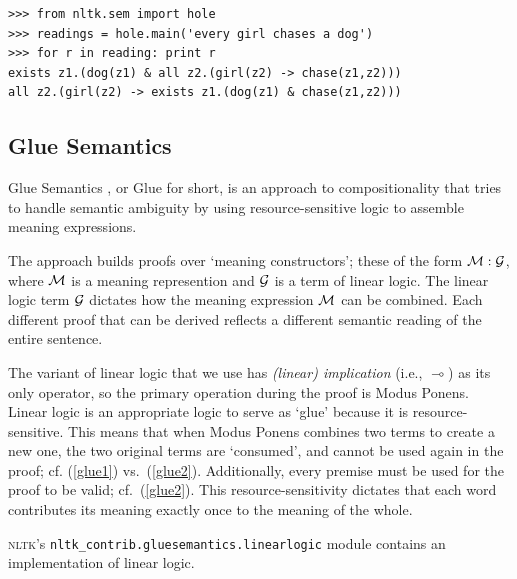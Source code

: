 \documentclass[11pt, a4paper]{article}
\newcommand{\NLTK}{\textsc{nltk}}
\newcommand{\dhgcode}[1]{{\tt #1}}
\begin{document}
\begin{Verbatim}
>>> from nltk.sem import hole
>>> readings = hole.main('every girl chases a dog')
>>> for r in reading: print r
exists z1.(dog(z1) & all z2.(girl(z2) -> chase(z1,z2)))
all z2.(girl(z2) -> exists z1.(dog(z1) & chase(z1,z2)))
\end{Verbatim}


\subsection{Glue Semantics}
Glue Semantics \citep{Dalrymple:1999:RRB,Dalrymple2001}, or Glue for
short, is an approach
to compositionality that tries to handle semantic ambiguity by using resource-sensitive logic to assemble meaning
expressions.  

The approach builds proofs over `meaning constructors'; these of the
form $\cal{M}: \cal{G}$, where $\cal{M}$ is a meaning represention and
$\cal{G}$ is a term of linear logic.  The linear logic term $\cal{G}$
dictates how the meaning expression $\cal{M}$ can be combined.  Each
different proof that can be derived reflects a different semantic
reading of the entire sentence.

The variant of linear logic that we use has \emph{(linear)
  implication} (i.e., $\multimap$)  as its
only operator, so the primary operation during the proof is Modus
Ponens.  Linear logic is an appropriate logic to serve as `glue'
because it is resource-sensitive.  This means that when Modus Ponens
combines two terms to create a new one, the two original
terms are `consumed', and cannot be used again in the proof;
cf. (\ref{glue1}) vs.\ (\ref{glue2}).
Additionally, every premise must be used for the proof to be valid;
cf.\ (\ref{glue2}).
This resource-sensitivity dictates that each word contributes its
meaning exactly once to the meaning of the whole.

\NLTK's \dhgcode{nltk\_contrib.gluesemantics.linearlogic} module
contains an implementation of linear logic. 
\end{document}
